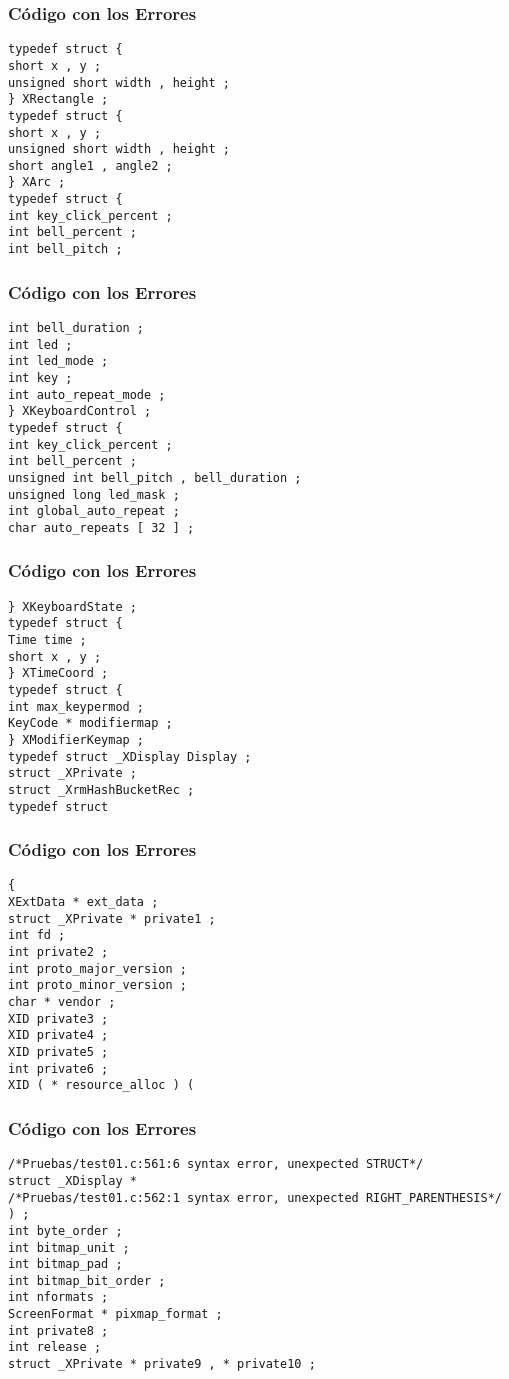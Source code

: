 \documentclass{beamer}
\begin{document}
\begin{frame}[fragile]
\frametitle{C\'odigo con los Errores}
\begin{verbatim}
typedef struct { 
short x , y ; 
unsigned short width , height ; 
} XRectangle ; 
typedef struct { 
short x , y ; 
unsigned short width , height ; 
short angle1 , angle2 ; 
} XArc ; 
typedef struct { 
int key_click_percent ; 
int bell_percent ; 
int bell_pitch ; 
\end{verbatim}
\end{frame}
\begin{frame}[fragile]
\frametitle{C\'odigo con los Errores}
\begin{verbatim}
int bell_duration ; 
int led ; 
int led_mode ; 
int key ; 
int auto_repeat_mode ; 
} XKeyboardControl ; 
typedef struct { 
int key_click_percent ; 
int bell_percent ; 
unsigned int bell_pitch , bell_duration ; 
unsigned long led_mask ; 
int global_auto_repeat ; 
char auto_repeats [ 32 ] ; 
\end{verbatim}
\end{frame}
\begin{frame}[fragile]
\frametitle{C\'odigo con los Errores}
\begin{verbatim}
} XKeyboardState ; 
typedef struct { 
Time time ; 
short x , y ; 
} XTimeCoord ; 
typedef struct { 
int max_keypermod ; 
KeyCode * modifiermap ; 
} XModifierKeymap ; 
typedef struct _XDisplay Display ; 
struct _XPrivate ; 
struct _XrmHashBucketRec ; 
typedef struct 
\end{verbatim}
\end{frame}
\begin{frame}[fragile]
\frametitle{C\'odigo con los Errores}
\begin{verbatim}
{ 
XExtData * ext_data ; 
struct _XPrivate * private1 ; 
int fd ; 
int private2 ; 
int proto_major_version ; 
int proto_minor_version ; 
char * vendor ; 
XID private3 ; 
XID private4 ; 
XID private5 ; 
int private6 ; 
XID ( * resource_alloc ) ( 
\end{verbatim}
\end{frame}
\begin{frame}[fragile]
\frametitle{C\'odigo con los Errores}
\begin{verbatim}
/*Pruebas/test01.c:561:6 syntax error, unexpected STRUCT*/
struct _XDisplay * 
/*Pruebas/test01.c:562:1 syntax error, unexpected RIGHT_PARENTHESIS*/
) ; 
int byte_order ; 
int bitmap_unit ; 
int bitmap_pad ; 
int bitmap_bit_order ; 
int nformats ; 
ScreenFormat * pixmap_format ; 
int private8 ; 
int release ; 
struct _XPrivate * private9 , * private10 ; 
\end{verbatim}
\end{frame}
\end{document}
